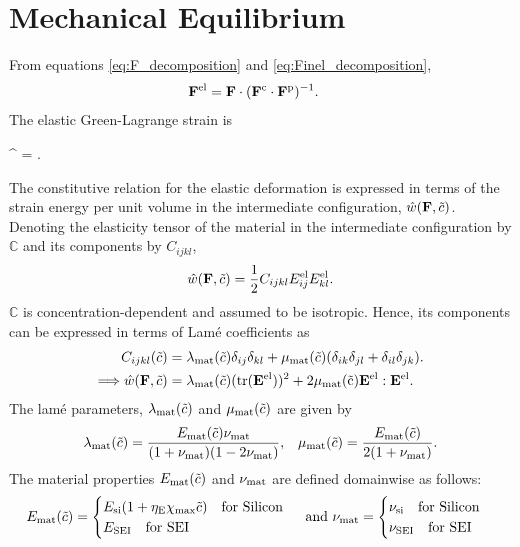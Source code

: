 \section{Mechanical Equilibrium } \label{section:MechEqbm}
From equations \ref{eq:F_decomposition} and \ref{eq:Finel_decomposition},
\begin{align}
    \mathbf{F}^{{\rm{el}}} &=  \mathbf{F} \cdot (\mathbf{F}^{{\rm{c}}} \cdot \mathbf{F}^{{\rm{p}}})^{-1}. \label{eq:Fel_tensor}
\end{align}
The elastic Green-Lagrange strain is
\begin{nonumbereq}
\E^{\el} =  \left[ (\F^\el)^\T \cdot  \F^\el - \I \right].
\end{nonumbereq}

The constitutive relation for the elastic deformation is expressed in terms of the strain energy per unit volume in the intermediate configuration, $\hat{w}(\mathbf{F}, \tilde{c})$. Denoting the elasticity tensor of the material in the intermediate configuration by $\mathbb{C}$ and its components by $C_{ijkl}$,
\begin{gather}
    \hat{w}(\mathbf{F}, \tilde{c}) = \frac{1}{2} C_{ijkl} E_{ij}^{{\rm{el}}} E_{kl}^{{\rm{el}}}.
\end{gather}
$\mathbb{C}$ is concentration-dependent and assumed to be isotropic. Hence, its components can be expressed in terms of Lam\'{e} coefficients as 
\begin{align}
 C_{ijkl}(\tilde{c}) &= \lambda_{\rm{mat}}(\tilde{c})\delta_{ij} \delta_{kl} +  \mu_{\rm{mat}}(\tilde{c})(\delta_{ik} \delta_{jl} + \delta_{il} \delta_{jk}). \\
    \Longrightarrow \hat{w}(\mathbf{F}, \tilde{c}) &= \lambda_{\rm{mat}}(\tilde{c}) (\rm{tr}(\mathbf{E}^{\rm{el}}))^2 + 2 \mu_{\rm{mat}}(\tilde{c}) \mathbf{E}^{{\rm{el}}}:\mathbf{E}^{{\rm{el}}}.
\end{align}
The lam\'{e} parameters, $\lambda_{\rm{mat}}(\tilde{c})$ and $\mu_{\rm{mat}}(\tilde{c})$ are given by
\begin{align}
    \lambda_{\rm{mat}}(\tilde{c}) = \frac{E_{\rm{mat}}(\tilde{c}) \nu_{\rm{mat}}}{(1+\nu_{\rm{mat}})(1-2\nu_{\rm{mat}})},
    && \mu_{\rm{mat}}(\tilde{c}) = \frac{E_{\rm{mat}}(\tilde{c})}{2(1+\nu_{\rm{mat}})}. \nonumber
\end{align}
The material properties $E_{\rm{mat}}(\tilde{c})$ and $\nu_{\rm{mat}}$ are defined domainwise as follows:
\[E_{\rm{mat}}(\tilde{c}) = \begin{cases}
 E_{\text{si}}(1 + \eta_{\rm{E}} \chi_{\rm{max}} \tilde{c}) \text{\quad for Silicon} \\
 E_{\rm{SEI}} \text{\quad for SEI }
\end{cases} \text{ and }
\nu_{\rm{mat}} = \begin{cases}
     \nu_{{\rm{si}}} \text{\quad for Silicon} \\
     \nu_{\rm{SEI}} \text{\quad for SEI }
\end{cases}\]
